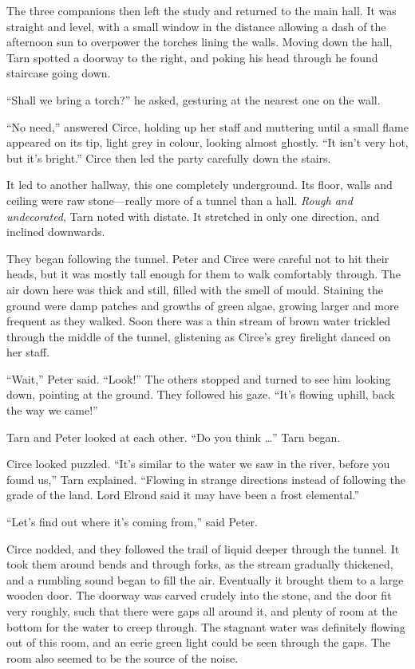 The three companions then left the study and returned to the main hall.  It was straight and level, with a small window in the distance allowing a dash of the afternoon sun to overpower the torches lining the walls.  Moving down the hall, Tarn spotted a doorway to the right, and poking his head through he found staircase going down.

``Shall we bring a torch?'' he asked, gesturing at the nearest one on the wall.

``No need,'' answered Circe, holding up her staff and muttering until a small flame appeared on its tip, light grey in colour, looking almost ghostly.  ``It isn't very hot, but it's bright.'' Circe then led the party carefully down the stairs.

It led to another hallway, this one completely underground.  Its floor, walls and ceiling were raw stone---really more of a tunnel than a hall.  \emph{Rough and undecorated}, Tarn noted with distate.  It stretched in only one direction, and inclined downwards.

They began following the tunnel.  Peter and Circe were careful not to hit their heads, but it was mostly tall enough for them to walk comfortably through.  The air down here was thick and still, filled with the smell of mould.   Staining the ground were damp patches and growths of green algae, growing larger and more frequent as they walked.  Soon there was a thin stream of brown water trickled through the middle of the tunnel, glistening as Circe's grey firelight danced on her staff.

``Wait,'' Peter said.  ``Look!''  The others stopped and turned to see him looking down, pointing at the ground.  They followed his gaze.  ``It's flowing uphill, back the way we came!''

Tarn and Peter looked at each other.  ``Do you think \ldots'' Tarn began.

Circe looked puzzled.  ``It's similar to the water we saw in the river, before you found us,'' Tarn explained.  ``Flowing in strange directions instead of following the grade of the land.  Lord Elrond said it may have been a frost elemental.''

``Let's find out where it's coming from,'' said Peter.

Circe nodded, and they followed the trail of liquid deeper through the tunnel.  It took them around bends and through forks, as the stream gradually thickened, and a rumbling sound began to fill the air.  Eventually it brought them to a large wooden door.  The doorway was carved crudely into the stone, and the door fit very roughly, such that there were gaps all around it, and plenty of room at the bottom for the water to creep through.  The stagnant water was definitely flowing out of this room, and an eerie green light could be seen through the gaps.  The room also seemed to be the source of the noise.

